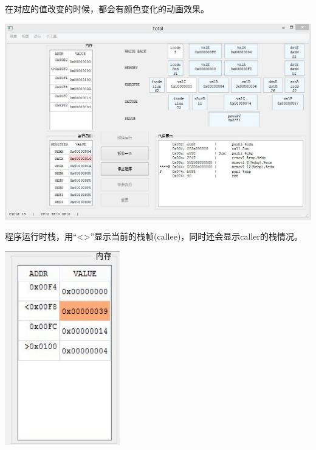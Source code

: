 \documentclass{article}
\begin{document}
在对应的值改变的时候，都会有颜色变化的动画效果。
\begin{center}
\includegraphics[width = 15cm]{2.jpg}
\end{center}

\begin{center}
程序运行时栈，用“<>”显示当前的栈帧(callee)，同时还会显示caller的栈情况。

\includegraphics[width = 5cm]{3.jpg}
\end{center}
\end{document}

